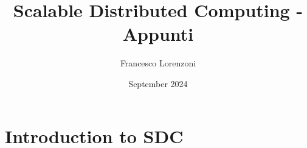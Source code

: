 

\title{Scalable Distributed Computing - Appunti}
\author{Francesco Lorenzoni}
\date{September 2024}


\makeatletter
\renewcommand{\l@section}{\@dottedtocline{1}{1.5em}{2.6em}}
\renewcommand{\l@subsection}{\@dottedtocline{2}{2.5em}{3.6em}}
\renewcommand{\l@subsubsection}{\@dottedtocline{3}{3.5em}{4.5em}}
\makeatother
{} %



\doparttoc[n]

\maketitle
\tableofcontents

\part{Introduction to SDC}
\parttoc









